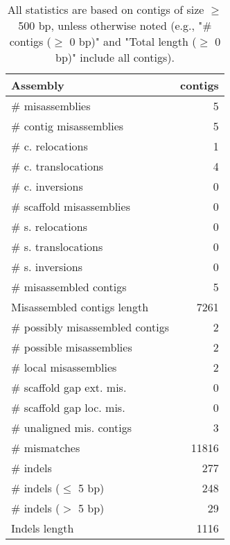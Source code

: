 \documentclass[12pt,a4paper]{article}
\begin{document}
\begin{table}[ht]
\begin{center}
\caption{All statistics are based on contigs of size $\geq$ 500 bp, unless otherwise noted (e.g., "\# contigs ($\geq$ 0 bp)" and "Total length ($\geq$ 0 bp)" include all contigs).}
\begin{tabular}{|l*{1}{|r}|}
\hline
Assembly & contigs \\ \hline
\# misassemblies & 5 \\ \hline
\hspace{2mm}\# contig misassemblies & 5 \\ \hline
\hspace{5mm}\# c. relocations & 1 \\ \hline
\hspace{5mm}\# c. translocations & 4 \\ \hline
\hspace{5mm}\# c. inversions & 0 \\ \hline
\hspace{2mm}\# scaffold misassemblies & 0 \\ \hline
\hspace{5mm}\# s. relocations & 0 \\ \hline
\hspace{5mm}\# s. translocations & 0 \\ \hline
\hspace{5mm}\# s. inversions & 0 \\ \hline
\# misassembled contigs & 5 \\ \hline
Misassembled contigs length & 7261 \\ \hline
\# possibly misassembled contigs & 2 \\ \hline
\hspace{5mm}\# possible misassemblies & 2 \\ \hline
\# local misassemblies & 2 \\ \hline
\# scaffold gap ext. mis. & 0 \\ \hline
\# scaffold gap loc. mis. & 0 \\ \hline
\# unaligned mis. contigs & 3 \\ \hline
\# mismatches & 11816 \\ \hline
\# indels & 277 \\ \hline
\hspace{5mm}\# indels ($\leq$ 5 bp) & 248 \\ \hline
\hspace{5mm}\# indels ($>$ 5 bp) & 29 \\ \hline
Indels length & 1116 \\ \hline
\end{tabular}
\end{center}
\end{table}
\end{document}
